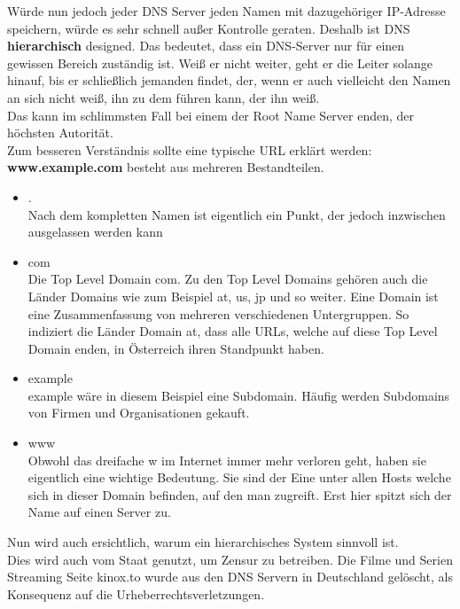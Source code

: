 \documentclass[12pt,a4paper]{report}
\begin{document}
\begin{onehalfspace}
Würde nun jedoch jeder DNS Server jeden Namen mit dazugehöriger IP-Adresse speichern, würde es sehr schnell außer Kontrolle geraten. Deshalb ist DNS \textbf{hierarchisch} designed. Das bedeutet, dass ein DNS-Server nur für einen gewissen Bereich zuständig ist. Weiß er nicht weiter, geht er die Leiter solange hinauf, bis er schließlich jemanden findet, der, wenn er auch vielleicht den Namen an sich nicht weiß, ihn zu dem führen kann, der ihn weiß.\\
Das kann im schlimmsten Fall bei einem der Root Name Server enden, der höchsten Autorität.\\

Zum besseren Verständnis sollte eine typische URL erklärt werden:\\
\textbf{www.example.com} besteht aus mehreren Bestandteilen.
\begin{itemize}
\item .\\
Nach dem kompletten Namen ist eigentlich ein Punkt, der jedoch inzwischen ausgelassen werden kann
\item com\\
Die Top Level Domain \glqq com\grqq . Zu den Top Level Domains gehören auch die Länder Domains wie zum Beispiel at, us, jp und so weiter. Eine Domain ist eine Zusammenfassung von mehreren verschiedenen Untergruppen. So indiziert die Länder Domain at, dass alle URLs, welche auf diese Top Level Domain enden, in Österreich ihren Standpunkt haben.
\item example\\
example wäre in diesem Beispiel eine Subdomain. Häufig werden Subdomains von Firmen und Organisationen gekauft. 
\item www\\
Obwohl das dreifache w im Internet immer mehr verloren geht, haben sie eigentlich eine wichtige Bedeutung. Sie sind der Eine unter allen Hosts welche sich in dieser Domain befinden, auf den man zugreift. Erst hier spitzt sich der Name auf einen Server zu. 
\end{itemize}
Nun wird auch ersichtlich, warum ein hierarchisches System sinnvoll ist.\\

Dies wird auch vom Staat genutzt, um Zensur zu betreiben. Die Filme und Serien Streaming Seite kinox.to wurde aus den DNS Servern in Deutschland gelöscht, als Konsequenz auf die Urheberrechtsverletzungen.\\


\end{onehalfspace}
\end{document}
